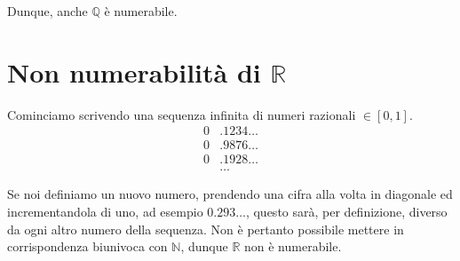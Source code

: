\documentclass[../../dimostrazioni]{subfiles}
\begin{document}
            Dunque, anche \(\mathbb{Q}\) è numerabile.

        \newpage

        \section*{Non numerabilità di \(\mathbb{R}\)}

            Cominciamo scrivendo una sequenza infinita di numeri razionali \(\in [0, 1]\).
            \begin{align*}
                0&.1234\dots\\
                0&.9876\dots\\
                0&.1928\dots\\
                &\dots
            \end{align*}

            Se noi definiamo un nuovo numero, prendendo una cifra alla volta in diagonale ed incrementandola di uno,
            ad esempio \(0.293\dots\), questo sarà, per definizione, diverso da ogni altro numero della sequenza.
            Non è pertanto possibile mettere in corrispondenza biunivoca con \(\mathbb{N}\), dunque \(\mathbb{R}\)
            non è numerabile.
\end{document}
